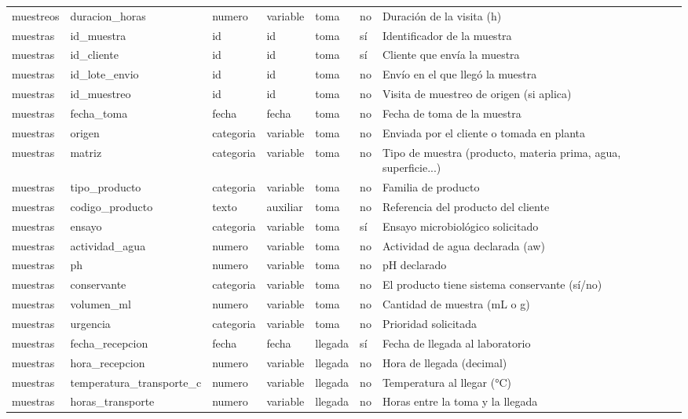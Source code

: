 \begin{tabular}{lllllll}
muestreos & duracion\_horas & numero & variable & toma & no & Duración de la visita (h) \\
muestras & id\_muestra & id & id & toma & sí & Identificador de la muestra \\
muestras & id\_cliente & id & id & toma & sí & Cliente que envía la muestra \\
muestras & id\_lote\_envio & id & id & toma & no & Envío en el que llegó la muestra \\
muestras & id\_muestreo & id & id & toma & no & Visita de muestreo de origen (si aplica) \\
muestras & fecha\_toma & fecha & fecha & toma & no & Fecha de toma de la muestra \\
muestras & origen & categoria & variable & toma & no & Enviada por el cliente o tomada en planta \\
muestras & matriz & categoria & variable & toma & no & Tipo de muestra (producto, materia prima, agua, superficie...) \\
muestras & tipo\_producto & categoria & variable & toma & no & Familia de producto \\
muestras & codigo\_producto & texto & auxiliar & toma & no & Referencia del producto del cliente \\
muestras & ensayo & categoria & variable & toma & sí & Ensayo microbiológico solicitado \\
muestras & actividad\_agua & numero & variable & toma & no & Actividad de agua declarada (aw) \\
muestras & ph & numero & variable & toma & no & pH declarado \\
muestras & conservante & categoria & variable & toma & no & El producto tiene sistema conservante (sí/no) \\
muestras & volumen\_ml & numero & variable & toma & no & Cantidad de muestra (mL o g) \\
muestras & urgencia & categoria & variable & toma & no & Prioridad solicitada \\
muestras & fecha\_recepcion & fecha & fecha & llegada & sí & Fecha de llegada al laboratorio \\
muestras & hora\_recepcion & numero & variable & llegada & no & Hora de llegada (decimal) \\
muestras & temperatura\_transporte\_c & numero & variable & llegada & no & Temperatura al llegar (°C) \\
muestras & horas\_transporte & numero & variable & llegada & no & Horas entre la toma y la llegada \\

\end{tabular}
